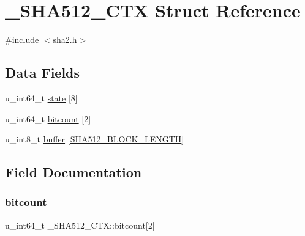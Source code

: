 \hypertarget{struct__SHA512__CTX}{}\section{\+\_\+\+S\+H\+A512\+\_\+\+C\+TX Struct Reference}
\label{struct__SHA512__CTX}


{\ttfamily \#include $<$sha2.\+h$>$}

\subsection*{Data Fields}
\begin{DoxyCompactItemize}
\item 
u\+\_\+int64\+\_\+t \mbox{\hyperlink{struct__SHA512__CTX_ad50dd340342510780b1f8d4815df4886}{state}} \mbox{[}8\mbox{]}
\item 
u\+\_\+int64\+\_\+t \mbox{\hyperlink{struct__SHA512__CTX_a9470c5978b614eef8a14721b23587ef3}{bitcount}} \mbox{[}2\mbox{]}
\item 
u\+\_\+int8\+\_\+t \mbox{\hyperlink{struct__SHA512__CTX_a522883b7cf86e3a149f078e4f8a6b912}{buffer}} \mbox{[}\mbox{\hyperlink{sha2_8h_a768752124501032a219d4426b2ce3197}{S\+H\+A512\+\_\+\+B\+L\+O\+C\+K\+\_\+\+L\+E\+N\+G\+TH}}\mbox{]}
\end{DoxyCompactItemize}


\subsection{Field Documentation}
\mbox{\label{struct__SHA512__CTX_a9470c5978b614eef8a14721b23587ef3}} 
\subsubsection{\texorpdfstring{bitcount}{bitcount}}
{\footnotesize\ttfamily u\+\_\+int64\+\_\+t \+\_\+\+S\+H\+A512\+\_\+\+C\+T\+X\+::bitcount\mbox{[}2\mbox{]}}

\mbox{\label{struct__SHA512__CTX_a522883b7cf86e3a149f078e4f8a6b912}} 
